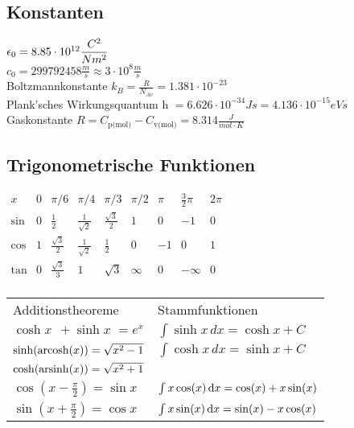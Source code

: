 \documentclass[fs, footer]{latex4ei}
\begin{document}
\begin{multicols*}{4}
\subsection{Konstanten}
$ \epsilon_0 = 8.85\cdot 10^{12} \dfrac{C^2}{Nm^2}$\\
$ c_0 = 299 792 458 \frac{m}{s} \approx 3\cdot 10^8 \frac{m}{s}$\\
Boltzmannkonstante $k_B = \frac{R}{N_{Av}} = 1.381\cdot 10^{-23}$\\
Plank'sches Wirkungsquantum h $= 6.626\cdot 10^{-34}Js = 4.136\cdot 10^{-15}eVs$\\
Gaskonstante $R = C_{\text{p(mol)}} - C_{\text{v(mol)}} = 8.314 \frac{J}{mol\cdot K}$\\


\subsection{Trigonometrische Funktionen}

$\begin{array}{c|c|c|c|c|c|c|c|c}
x & 0 & \pi / 6 & \pi / 4 & \pi / 3 & \pi / 2 & \pi & \frac{3}{2}\pi & 2 \pi \\ \hline
\sin & 0 & \frac{1}{2} & \frac{1}{\sqrt{2}} & \frac{\sqrt 3}{2} & 1 & 0 & -1 & 0 \\
\cos & 1 & \frac{\sqrt 3}{2} & \frac{1}{\sqrt 2} & \frac{1}{2} & 0 & -1 & 0 & 1 \\     
\tan & 0 & \frac{\sqrt{3}}{3}&	1				 &	\sqrt{3} & \infty & 0 & - \infty & 0\\
\end{array}$ 

\iffalse
\begin{tabular}{l  l} 
		Additionstheoreme &	Stammfunktionen \\
	$\cosh x \,\; + \sinh x \,\,= e^{x}$ & $\int \sinh x \, dx = \cosh x + C$\\
	$\sinh({\rm arcosh}(x)) = \sqrt{x^2 - 1}$ & $\int \cosh x \, dx = \sinh x + C $\\
	$\cosh({\rm arsinh}(x)) = \sqrt{x^2 + 1}$ \\
	
 	$\cos (x - \frac{\pi}{2}) = \sin x$ & $\int x \cos(x) \diff x = \cos(x) + x \sin(x)$\\
 	
 	 $\sin (x + \frac{\pi}{2}) = \cos x$ & $\int x \sin(x) \diff x = \sin(x) - x \cos(x)$\\
 	

\end{tabular}
\end{multicols*}
\end{document}
